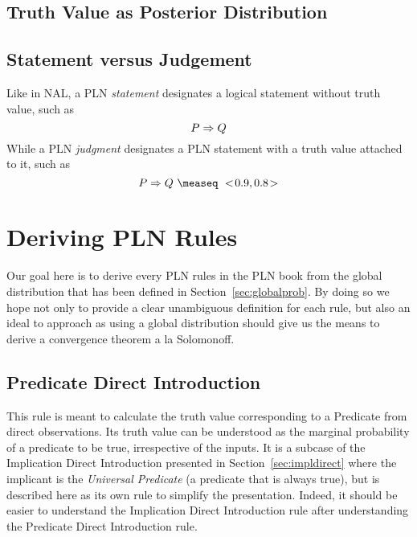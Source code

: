 \documentclass[]{article}
\begin{document}
\subsection{Truth Value as Posterior Distribution}
\label{sec:truthvalue}

\subsection{Statement versus Judgement}
\label{sec:statjudge}
Like in NAL, a PLN \emph{statement} designates a logical statement
without truth value, such as
$$P \Rightarrow Q$$ While a PLN \emph{judgment} designates a PLN statement
with a truth value attached to it, such as
$$P \limp Q\ \measeq\ \STV{0.9}{0.8}$$

\section{Deriving PLN Rules}
\label{sec:derules}
Our goal here is to derive every PLN rules in the PLN book from the
global distribution that has been defined in
Section~\ref{sec:globalprob}.  By doing so we hope not only to
provide a clear unambiguous definition for each rule, but also an
ideal to approach as using a global distribution should give us the
means to derive a convergence theorem a la Solomonoff.

\subsection{Predicate Direct Introduction}
This rule is meant to calculate the truth value corresponding to a
Predicate from direct observations.  Its truth value can be understood
as the marginal probability of a predicate to be true, irrespective of
the inputs.  It is a subcase of the Implication Direct Introduction
presented in Section~\ref{sec:impldirect} where the implicant is the
\emph{Universal Predicate} (a predicate that is always true), but is
described here as its own rule to simplify the presentation.  Indeed,
it should be easier to understand the Implication Direct Introduction
rule after understanding the Predicate Direct Introduction rule.
\end{document}
